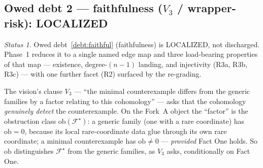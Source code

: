 \documentclass[11pt,oneside]{amsart}
\theoremstyle{plain}
\theoremstyle{definition}
\theoremstyle{remark}
\theoremstyle{honeststyle}
\newtheorem{status}[theorem]{Status}
\newcommand{\F}{\mathcal{F}}
\newcommand{\Fstar}{\F^{\star}}
\newcommand{\ob}{\mathrm{ob}}
\begin{document}
\subsection{Owed debt 2 --- faithfulness ($V_3$ / wrapper-risk): LOCALIZED}
\label{ssec:debt2}

\begin{status}
\label{status:debt2}
Owed debt~\ref{debt:faithful} (faithfulness) is \textsf{LOCALIZED, not
discharged}. Phase~1 reduces it to a single named edge map and three
load-bearing properties of that map --- existence, degree-$(n-1)$
landing, and injectivity (R3a, R3b, R3c) --- with one further facet
(R2) surfaced by the re-grading.
\end{status}

The vision's clause $V_3$ --- ``the minimal counterexample differs
from the generic families by a factor relating to this cohomology''
--- asks that the cohomology \emph{genuinely detect} the
counterexample. On the Fork~A object the ``factor'' is the obstruction
class $\ob(\Fstar)$: a generic family (one with a rare coordinate) has
$\ob=0$, because its local rare-coordinate data glue through its own
rare coordinate; a minimal counterexample has $\ob\neq0$ ---
\emph{provided} Fact One holds. So $\ob$ distinguishes $\Fstar$ from
the generic families, as $V_3$ asks, conditionally on Fact One.
\end{document}
